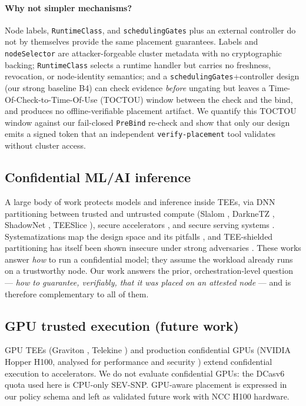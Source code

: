\paragraph{Why not simpler mechanisms?}
Node labels, \texttt{RuntimeClass}, and \texttt{schedulingGates} plus an external
controller do not by themselves provide the same placement guarantees.
Labels and \texttt{nodeSelector} are attacker-forgeable cluster metadata with no
cryptographic backing; \texttt{RuntimeClass} selects a runtime handler but
carries no freshness, revocation, or node-identity semantics; and a
\texttt{schedulingGates}+controller design (our strong baseline B4) can check
evidence \emph{before} ungating but leaves a Time-Of-Check-to-Time-Of-Use
(TOCTOU) window between the check and the bind, and produces no offline-verifiable
placement artifact. We quantify this TOCTOU window against our fail-closed
\texttt{PreBind} re-check and show that only our design emits a signed token that
an independent \texttt{verify-placement} tool validates without cluster access.

\subsection{Confidential ML/AI inference}
A large body of work protects models and inference inside TEEs, via DNN
partitioning between trusted and untrusted compute (Slalom \cite{tramer2019slalom},
DarkneTZ \cite{mo2020darknetz}, ShadowNet \cite{sun2020shadownet},
TEESlice \cite{li2024teeslice}), secure accelerators
\cite{hua2020guardnn,hashemi2022darknight}, and secure serving systems
\cite{ma2020s3ml,lee2020ppml,hu2024sesemi,schambach2026enclavex,yu2025dualprivacy,abdollahi2025ondevice,abdollahi2026agentee}.
Systematizations map the design space and its pitfalls
\cite{mo2022mlccsok,duy2021cmlsok}, and TEE-shielded partitioning has itself been
shown insecure under strong adversaries \cite{zhang2023noprivacy}. These works
answer \emph{how} to run a confidential model; they assume the workload already
runs on a trustworthy node. Our work answers the prior, orchestration-level
question --- \emph{how to guarantee, verifiably, that it was placed on an
attested node} --- and is therefore complementary to all of them.

\subsection{GPU trusted execution (future work)}
GPU TEEs (Graviton \cite{volos2018graviton}, Telekine \cite{hunt2020telekine})
and production confidential GPUs (NVIDIA Hopper H100, analysed for performance
\cite{zhu2024h100bench} and security \cite{gu2025gpucc}) extend confidential
execution to accelerators. We do not evaluate confidential GPUs: the DCasv6
quota used here is CPU-only SEV-SNP. GPU-aware placement is expressed in our
policy schema and left as validated future work with NCC H100 hardware.

